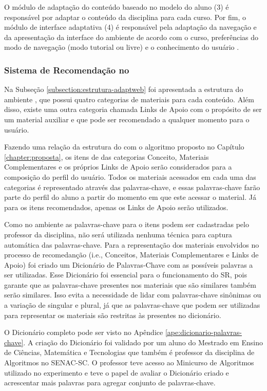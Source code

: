 O módulo de adaptação do conteúdo baseado no modelo do aluno (3) é responsável por adaptar o conteúdo da disciplina
para cada curso. Por fim, o módulo de interface adaptativa (4) é responsável pela adaptação da navegação e da
apresentação da interface do ambiente de acordo com o curso, preferências do modo de navegação (modo tutorial ou livre)
e o conhecimento do usuário \cite{gasparini2003interface}.

\subsubsection{Sistema de Recomendação no \adaptweb}

Na Subseção \ref{subsection:estrutura-adaptweb} foi apresentada a estrutura do ambiente \adaptweb, que possui quatro categorias
de materiais para cada conteúdo. Além disso, existe uma outra categoria chamada Links de Apoio com o propósito de ser um
material auxiliar e que pode ser recomendado a qualquer momento para o usuário.

Fazendo uma relação da estrutura do \adaptwebspace com o algoritmo proposto no Capítulo \ref{chapter:proposta}, os itens de
das categorias Conceito, Materiais Complementares e os próprios Links de Apoio serão considerados para a composição do perfil do usuário. Todos os
materiais acessados em cada uma das categorias é representado através das palavras-chave, e
essas palavras-chave farão parte do perfil do aluno a partir do momento em que este acessar o material. Já para os itens
recomendados, apenas os Links de Apoio serão utilizados.

Como no ambiente \adaptwebspace as palavras-chave para o itens podem ser cadastradas pelo professor da disciplina, não será
utilizada nenhuma técnica para captura automática das palavras-chave. Para a representação dos materiais envolvidos no
processo de recomedanção (i.e., Conceitos, Materiais Complementares e Links de Apoio) foi criado um Dicionário de Palavras-Chave
com as possíveis palavras a ser utilizadas. Esse Dicionário foi essencial para o funcionamento do SR, pois garante que as
palavras-chave presentes nos materiais que são similares também serão similares. Isso evita a necessidade de lidar com palavras-chave
sinônimas ou a variação de singular e plural, já que as palavras-chave que podem ser utilizadas para representar os materiais
são restritas às presentes no dicionário.

O Dicionário completo pode ser visto no Apêndice \ref{ape:dicionario-palavras-chave}. A criação do Dicionário foi validado
por um aluno do Mestrado em Ensino de Ciências, Matemática e Tecnologias que também é professor da disciplina de
Algoritmos no SENAC-SC. O professor teve acesso ao Minicurso de Algoritmos utilizado no experimento
e teve o papel de avaliar o Dicionário criado e acrescentar mais palavras para agregar conjunto de palavras-chave.

